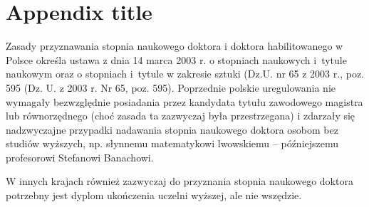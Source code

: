 \chapter{Appendix title}
Zasady przyznawania stopnia naukowego doktora i doktora habilitowanego w Polsce określa ustawa z dnia 14 marca 2003 r. o stopniach naukowych i~tytule naukowym oraz o stopniach i~tytule w zakresie sztuki (Dz.U. nr 65 z 2003 r., poz. 595 (Dz. U. z 2003 r. Nr 65, poz. 595). Poprzednie polskie uregulowania nie wymagały bezwzględnie posiadania przez kandydata tytułu zawodowego magistra lub równorzędnego (choć zasada ta zazwyczaj była przestrzegana) i zdarzały się nadzwyczajne przypadki nadawania stopnia naukowego doktora osobom bez studiów wyższych, np. słynnemu matematykowi lwowskiemu – późniejszemu profesorowi Stefanowi Banachowi. 

W innych krajach również zazwyczaj do przyznania stopnia naukowego doktora potrzebny jest dyplom ukończenia uczelni wyższej, ale nie wszędzie.

